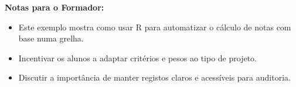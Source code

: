 \textbf{Notas para o Formador:}
\begin{itemize}
  \item Este exemplo mostra como usar R para automatizar o cálculo de notas com base numa grelha.
  \item Incentivar os alunos a adaptar critérios e pesos ao tipo de projeto.
  \item Discutir a importância de manter registos claros e acessíveis para auditoria.
\end{itemize}
